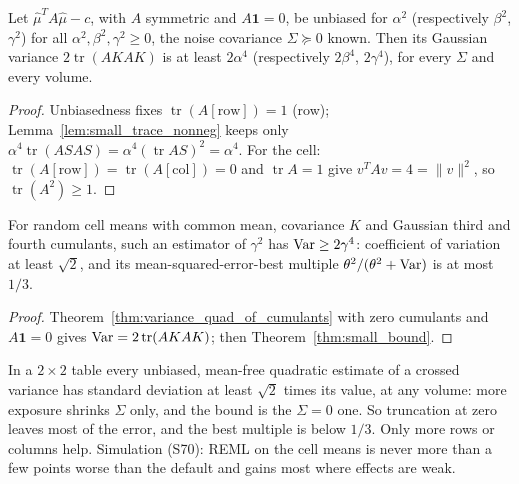 \begin{theorem}\label{thm:small_bound}
  \leanok
  Let $\hat\mu^TA\hat\mu - c$, with $A$ symmetric and $A\mathbf 1 = 0$, be unbiased for $\alpha^2$
  (respectively $\beta^2$, $\gamma^2$) for all $\alpha^2, \beta^2, \gamma^2 \ge 0$, the noise
  covariance $\Sigma \succeq 0$ known. Then its Gaussian variance $2\operatorname{tr}(AKAK)$ is at
  least $2\alpha^4$ (respectively $2\beta^4$, $2\gamma^4$), for every $\Sigma$ and every volume.
\end{theorem}
\begin{proof}
  \leanok
  Unbiasedness fixes $\operatorname{tr}(A[\text{row}]) = 1$ (row); Lemma~\ref{lem:small_trace_nonneg}
  keeps only $\alpha^4\operatorname{tr}(ASAS) = \alpha^4(\operatorname{tr}AS)^2 = \alpha^4$. For the cell:
  $\operatorname{tr}(A[\text{row}]) = \operatorname{tr}(A[\text{col}]) = 0$ and $\operatorname{tr}A = 1$
  give $v^TAv = 4 = \|v\|^2$, so $\operatorname{tr}(A^2) \ge 1$.
\end{proof}

\begin{theorem}\label{thm:small_variance}
  \leanok
  For random cell means with common mean, covariance $K$ and Gaussian third and fourth cumulants,
  such an estimator of $\gamma^2$ has $\operatorname{Var} \ge 2\gamma^4$: coefficient of variation at least
  $\sqrt 2$, and its mean-squared-error-best multiple $\theta^2/(\theta^2 + \operatorname{Var})$ is at most $1/3$.
\end{theorem}
\begin{proof}
  \leanok
  Theorem~\ref{thm:variance_quad_of_cumulants} with zero cumulants and $A\mathbf 1 = 0$ gives
  $\operatorname{Var} = 2\operatorname{tr}(AKAK)$; then Theorem~\ref{thm:small_bound}.
\end{proof}

\begin{remark}[Finding 44]\label{rem:finding44}
  In a $2\times 2$ table every unbiased, mean-free quadratic estimate of a crossed variance has standard
  deviation at least $\sqrt 2$ times its value, at any volume: more exposure shrinks $\Sigma$ only, and
  the bound is the $\Sigma = 0$ one. So truncation at zero leaves most of the error, and the best
  multiple is below $1/3$. Only more rows or columns help. Simulation (S70): REML on the cell means is
  never more than a few points worse than the default and gains most where effects are weak.
\end{remark}
